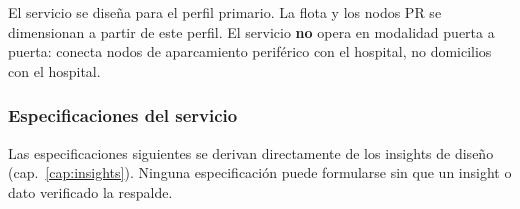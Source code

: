 El servicio se diseña para el perfil primario. La flota y los nodos
\acs{PR} se dimensionan a partir de este perfil. El servicio
\textbf{no} opera en modalidad puerta a puerta: conecta nodos de
aparcamiento periférico con el hospital, no domicilios con el hospital.


\subsubsection{Especificaciones del servicio}
\label{sec:pliego-especificaciones}

Las especificaciones siguientes se derivan directamente de los insights
de diseño (cap.~\ref{cap:insights}). Ninguna especificación puede
formularse sin que un insight o dato verificado la respalde.

